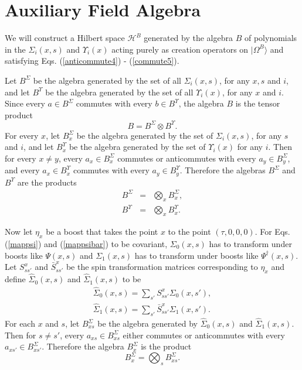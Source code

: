 \documentclass[12pt,amsmath,amssymb,onecolumn]{revtex4-2}
\begin{document}
\section{\label{app:auxalgebra} Auxiliary Field Algebra}

We will construct a
Hilbert space $\mathcal{H}^B$ generated by the algebra $B$
of polynomials in the $\Sigma_i( x, s)$ and $\Upsilon_i( x)$
acting purely as creation operators on $|\Omega^B \rangle $ and 
satisfying Eqs. (\ref{anticommute4}) - (\ref{commute5}).

Let $B^\Sigma$ be the algebra generated by the set of all $\Sigma_i( x, s)$, for any $x, s$ and $i$,
and let $B^\Upsilon$ be
the algebra generated by the set of all $\Upsilon_i(x)$, for any $x$ and $i$.
Since every $a \in B^\Sigma$ commutes with every $b \in B^\Upsilon$,
the algebra $B$ is the tensor product
\begin{equation}
  \label{basprod}
  B = B^\Sigma \otimes B^\Upsilon.
\end{equation}
For every $x$, let $B^\Sigma_x$ be
the algebra generated by the set of $\Sigma_i( x, s)$, for any $s$ and $i$,
and let $B^\Upsilon_x$ be
the algebra generated by the set of $\Upsilon_i( x)$ for any $i$.
Then for every $x \ne y$, every $a_x \in  B^\Sigma_x$
commutes or anticommutes with every $a_y \in  B^\Sigma_y$,
and every
$a_x \in  B^\Upsilon_x$
commutes with every $a_y \in  B^\Upsilon_y$.
Therefore the algebras $B^\Sigma$ and $B^\Upsilon$ are the products
\begin{subequations}
\begin{eqnarray}
  \label{bsprod}
    B^\Sigma  &=&  \bigotimes_x B^\Sigma_x, \\
  \label{buprod}
  B^\Upsilon  &=&  \bigotimes_x B^\Upsilon_x.
\end{eqnarray}
\end{subequations}

Now let $\eta_x$ be a boost that takes the point $x$ to the point $(\tau, 0, 0, 0)$.
For Eqs. (\ref{mappsi}) and (\ref{mappsibar}) to be covariant,
$\Sigma_0(x,s)$ has to transform under boosts like $\Psi( x, s)$ and 
$\Sigma_1(x,s)$ has to transform under boosts like $\Psi^\dagger( x, s)$.
Let $S^x_{ss'}$ and $\bar{S}^x_{ss'}$ be the spin transformation
matrices corresponding to $\eta_x$ and define $\hat{\Sigma}_0(x,s)$ and $\hat{\Sigma}_1(x,s)$ to be
\begin{subequations}
  \begin{eqnarray}
    \label{defhats0}
    \hat{\Sigma}_0(x,s) = \sum_{s'} S^x_{ss'} \Sigma_0( x, s'), \\
     \label{defhats1}
     \hat{\Sigma}_1(x,s) = \sum_{s'} \bar{S}^x_{ss'} \Sigma_1( x, s').
  \end{eqnarray}
\end{subequations}
For each $x$ and $s$, let $B^\Sigma_{xs}$ be the algebra generated by $\hat{\Sigma}_0(x,s)$
and $\hat{\Sigma}_1(x,s)$. Then for $s \ne s'$, every $a_{xs} \in B^\Sigma_{xs}$ either
commutes or anticommutes with every $a_{xs'} \in B^\Sigma_{xs'}$. Therefore the algebra
$B^\Sigma_x$ is the product
\begin{equation}
  \label{bxsprod}
    B^\Sigma_x  =  \bigotimes_s B^\Sigma_{xs}.
\end{equation}
\end{document}
